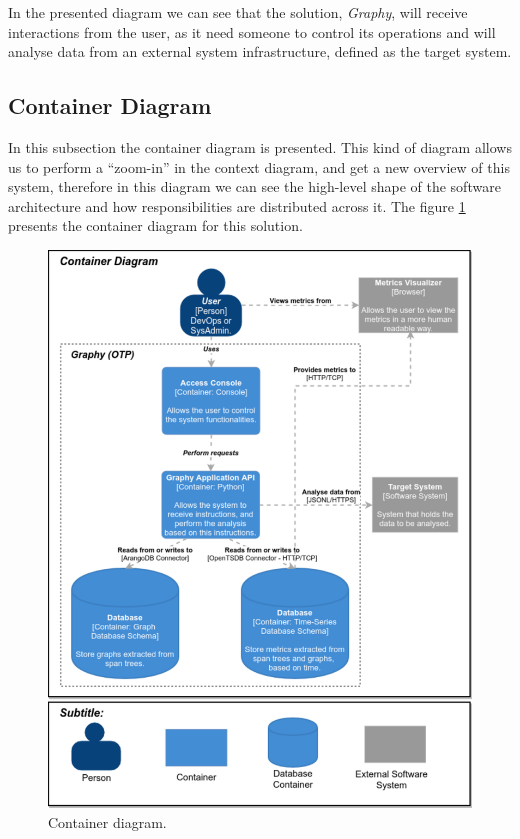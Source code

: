 In the presented diagram we can see that the solution, \textit{Graphy}, will receive interactions from the user, as it need someone to control its operations and will analyse data from an external system infrastructure, defined as the target system.


\subsection{Container Diagram}
\label{subsec:container_diagram}

In this subsection the container diagram is presented. This kind of diagram allows us to perform a ``zoom-in'' in the context diagram, and get a new overview of this system, therefore in this diagram we can see the high-level shape of the software architecture and how responsibilities are distributed across it. The figure \ref{fig:container_diagram} presents the container diagram for this solution.

\begin{figure}[!hb]
    \centering
    \includegraphics[width=1.00\textwidth]{images/container_diagram.pdf}
    \caption{Container diagram.}
    \label{fig:container_diagram}
\end{figure}

